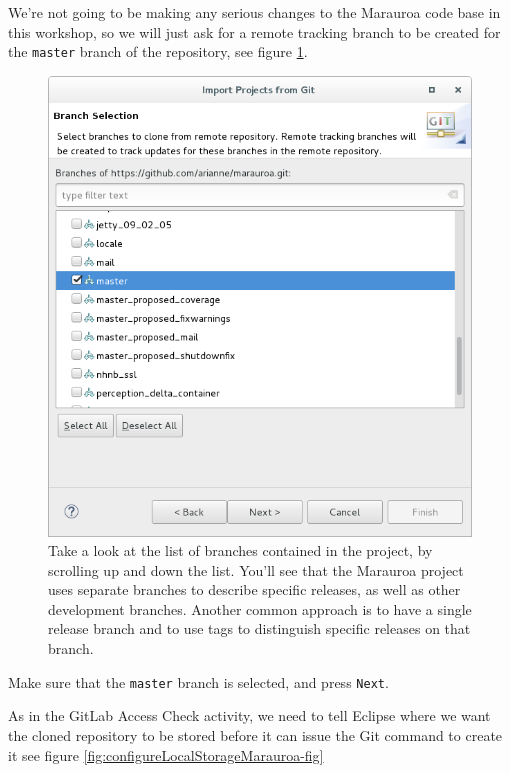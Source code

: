 \documentclass[
]{book}
\begin{document}
We're not going to be making any serious changes to the Marauroa code base in this workshop, so we will just ask for a remote tracking branch to be created for the \texttt{master} branch of the repository, see figure \ref{fig:selectMarauroaBranches-fig}.

\begin{figure}

{\centering \includegraphics[width=1\linewidth]{images/1.4selectMarauroaBranches} 

}

\caption{Take a look at the list of branches contained in the project, by scrolling up and down the list. You'll see that the Marauroa project uses separate branches to describe specific releases, as well as other development branches. Another common approach is to have a single release branch and to use tags to distinguish specific releases on that branch.}\label{fig:selectMarauroaBranches-fig}
\end{figure}

Make sure that the \texttt{master} branch is selected, and press \texttt{Next}.

As in the GitLab Access Check activity, we need to tell Eclipse where we want the cloned repository to be stored before it can issue the Git command to create it see figure \ref{fig:configureLocalStorageMarauroa-fig}
\end{document}
